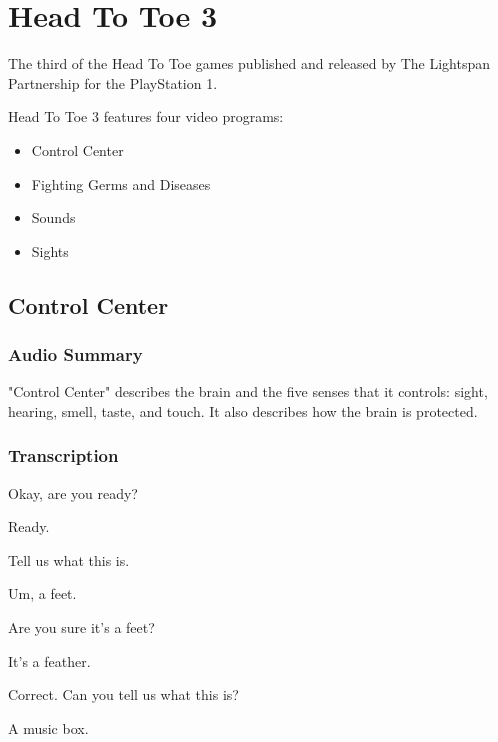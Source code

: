 \chapter{Head To Toe 3}


The third of the Head To Toe games published and released by The Lightspan Partnership for the PlayStation 1.

Head To Toe 3 features four video programs:

\begin{itemize}
    \item Control Center
    \item Fighting Germs and Diseases
    \item Sounds
    \item Sights
\end{itemize}

\clearpage
\newpage

\section{Control Center}

\subsection{Audio Summary}

"Control Center" describes the brain and the five senses that it controls: sight, hearing, smell, taste, and touch. It also describes how the brain is protected.

\subsection{Transcription}

Okay, are you ready?

Ready.

Tell us what this is.

Um, a feet.

Are you sure it's a feet?

It's a feather.

Correct. Can you tell us what this is?

A music box.

